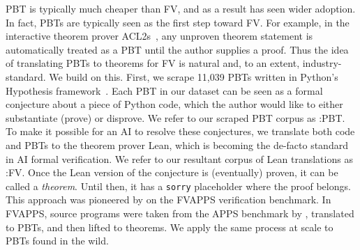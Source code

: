 PBT is typically much cheaper than FV, and as a result has seen wider adoption.
In fact, PBTs are typically seen as the first step toward FV. 
For example, in the interactive theorem prover ACL2s~\cite{dillinger2007acl2s}, any unproven theorem statement is automatically treated as a PBT until the author supplies a proof. 
Thus the idea of translating PBTs to theorems for FV is natural and, to an extent, industry-standard. We build on this. 
First, we scrape 11{,}039 PBTs written in Python's Hypothesis framework~\cite{maciver2019hypothesis}. 
Each PBT in our dataset can be seen as a formal conjecture about a piece of Python code, which the author would like to either substantiate (prove) or disprove. 
We refer to our scraped PBT corpus as \FVSpec:PBT.
To make it possible for an AI to resolve these conjectures, 
we translate both code and PBTs to the theorem prover Lean, which is becoming the de-facto standard in AI formal verification. 
We refer to our resultant corpus of Lean translations as \FVSpec:FV.
Once the Lean version of the conjecture is (eventually) proven, it can be called a \emph{theorem}.
Until then, it has a \texttt{sorry} placeholder where the proof belongs.
This approach was pioneered by \citet{dougherty2025proving} on the FVAPPS verification benchmark. In FVAPPS, source programs were taken from the APPS benchmark by \citet{hendrycks2021apps}, translated to PBTs, and then lifted to theorems. We apply the same process at scale to PBTs found in the wild.




